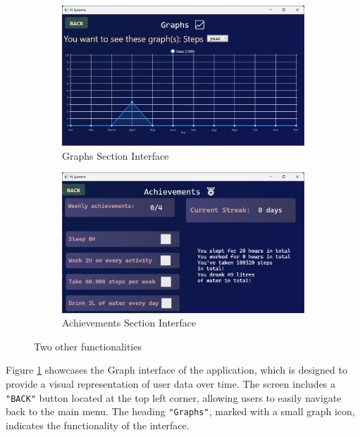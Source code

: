 \documentclass[11pt]{article}
\begin{document}
\begin{figure}[!ht]
  \centering
  \begin{subfigure}{0.4\linewidth}
    \includegraphics[width=\linewidth]{Graphs Screen}
    \caption{Graphs Section Interface}
    \label{fig:Graphs}
  \end{subfigure}
  \hfill
  \begin{subfigure}{0.4\linewidth}
    \includegraphics[width=\linewidth]{Achievements Screen}
    \caption{Achievements Section Interface}
    \label{fig:Achievements}
  \end{subfigure}
  \caption{Two other functionalities}
  \label{fig:subfunc}
\end{figure}

\newpage

Figure \ref{fig:Graphs} showcases the Graph interface of the application, which is
designed to provide a visual representation of user data over time. The screen 
includes a \texttt{"BACK"} button located at the top left corner, allowing users to easily
navigate back to the main menu. The heading \texttt{"Graphs"}, marked with a small graph icon,
indicates the functionality of the interface.\par
\end{document}
